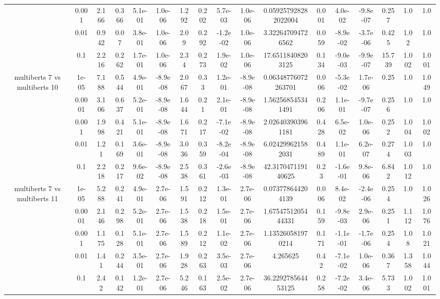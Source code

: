 \begin{tabular}{|c|c|c|c|c|c|c|c|c|c|c|c|c|c|c|c|c|}
 & 0.001 & 2.166 & 0.366 & 5.1e-01 & 1.0e-06 & 1.292 & 0.202 & 5.7e-03 & 1.0e-06 & 0.059257928282022004 & 0.001 & 4.0e-02 & -9.8e-07 & 0.257 & 1.0 & 1.0 \\
 & 0.01 & 0.942 & 0.07 & 3.8e-01 & 1.0e-06 & 2.09 & 0.292 & -1.2e-02 & 1.0e-06 & 3.322647094726562 & 0.059 & -8.9e-02 & -3.7e-06 & 0.425 & 1.02 & 1.0 \\
 & 0.1 & 2.216 & 0.262 & 1.7e-01 & 1.0e-06 & 2.34 & 0.273 & 1.9e-02 & 1.0e-06 & 17.65118408203125 & 0.134 & -9.0e-03 & -9.9e-07 & 15.739 & 1.002 & 1.001 \\
\hline
\multirow{5}{*}{multiberts 7 vs multiberts 10} & 1e-05 & 7.188 & 0.544 & 4.9e-01 & -8.9e-08 & 2.067 & 0.33 & 1.2e-01 & -8.9e-08 & 0.06348776072263701 & 0.006 & -5.3e-02 & 1.7e-06 & 0.25 & 1.0 & 1.049 \\
 & 0.0001 & 3.106 & 0.637 & 5.2e-01 & -8.9e-08 & 1.644 & 0.21 & 2.1e-01 & -8.9e-08 & 1.562568545341491 & 0.206 & 1.1e-01 & -9.7e-07 & 0.256 & 1.0 & 1.0 \\
 & 0.001 & 1.998 & 0.421 & 5.1e-01 & -8.9e-08 & 1.671 & 0.217 & -7.1e-02 & -8.9e-08 & 2.026403903961181 & 0.428 & 6.5e-02 & 1.0e-06 & 0.252 & 1.004 & 1.002 \\
 & 0.01 & 1.21 & 0.169 & 3.6e-01 & -8.9e-08 & 3.036 & 0.359 & -8.2e-04 & -8.9e-08 & 6.024299621582031 & 0.489 & 1.1e-01 & 6.2e-07 & 0.274 & 1.003 & 1.0 \\
 & 0.1 & 2.218 & 0.217 & 9.6e-02 & -8.9e-08 & 2.538 & 0.361 & -2.6e-03 & -8.9e-08 & 42.317047119140625 & 0.23 & -1.6e-01 & 9.8e-06 & 6.842 & 1.012 & 1.0 \\
\hline
\multirow{5}{*}{multiberts 7 vs multiberts 11} & 1e-05 & 5.288 & 0.241 & 4.9e-01 & 2.7e-06 & 1.591 & 0.212 & 1.3e-01 & 2.7e-06 & 0.073778644204139 & 0.006 & 8.4e-02 & -2.4e-06 & 0.254 & 1.0 & 1.026 \\
 & 0.0001 & 2.146 & 0.298 & 5.2e-01 & 2.7e-06 & 1.538 & 0.218 & 1.5e-01 & 2.7e-06 & 1.6754751205444331 & 0.159 & -9.8e-03 & 2.9e-06 & 0.251 & 1.112 & 1.076 \\
 & 0.001 & 1.175 & 0.128 & 5.1e-01 & 2.7e-06 & 1.589 & 0.212 & 1.1e-02 & 2.7e-06 & 1.135260581970214 & 0.171 & -1.1e-01 & -1.7e-06 & 0.254 & 1.08 & 1.021 \\
 & 0.01 & 1.41 & 0.244 & 3.5e-01 & 2.7e-06 & 1.928 & 0.263 & 3.5e-03 & 2.7e-06 & 4.265625 & 0.42 & -7.1e-02 & 1.0e-06 & 0.367 & 1.358 & 1.044 \\
 & 0.1 & 2.42 & 0.142 & 1.2e-01 & 2.7e-06 & 5.246 & 0.163 & 2.5e-02 & 2.7e-06 & 36.229278564453125 & 0.258 & -7.2e-02 & 3.4e-06 & 5.733 & 1.002 & 1.001 \\

\end{tabular}

